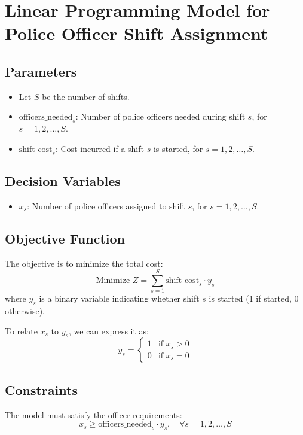 \documentclass{article}
\begin{document}
\section*{Linear Programming Model for Police Officer Shift Assignment}

\subsection*{Parameters}
\begin{itemize}
    \item Let \( S \) be the number of shifts.
    \item \( \text{officers\_needed}_s \): Number of police officers needed during shift \( s \), for \( s = 1, 2, \ldots, S \).
    \item \( \text{shift\_cost}_s \): Cost incurred if a shift \( s \) is started, for \( s = 1, 2, \ldots, S \).
\end{itemize}

\subsection*{Decision Variables}
\begin{itemize}
    \item \( x_s \): Number of police officers assigned to shift \( s \), for \( s = 1, 2, \ldots, S \).
\end{itemize}

\subsection*{Objective Function}
The objective is to minimize the total cost:
\[
\text{Minimize } Z = \sum_{s=1}^{S} \text{shift\_cost}_s \cdot y_s
\]
where \( y_s \) is a binary variable indicating whether shift \( s \) is started (1 if started, 0 otherwise). 

To relate \( x_s \) to \( y_s \), we can express it as:
\[
y_s = 
\begin{cases}
1 & \text{if } x_s > 0 \\
0 & \text{if } x_s = 0
\end{cases}
\]

\subsection*{Constraints}
The model must satisfy the officer requirements:
\[
x_s \geq \text{officers\_needed}_s \cdot y_s, \quad \forall s = 1, 2, \ldots, S
\]
\end{document}
